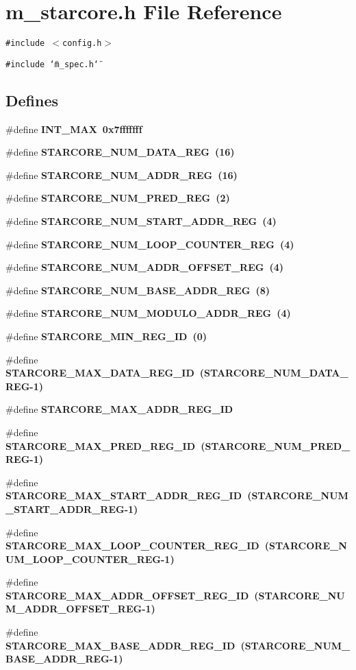 \section{m\_\-starcore.h File Reference}
\label{m__starcore_8h}
{\tt \#include $<$config.h$>$}\par
{\tt \#include \char`\"{}m\_\-spec.h\char`\"{}}\par
\subsection*{Defines}
\begin{CompactItemize}
\item 
\#define \bf{INT\_\-MAX}~0x7fffffff
\item 
\#define \bf{STARCORE\_\-NUM\_\-DATA\_\-REG}~(16)
\item 
\#define \bf{STARCORE\_\-NUM\_\-ADDR\_\-REG}~(16)
\item 
\#define \bf{STARCORE\_\-NUM\_\-PRED\_\-REG}~(2)
\item 
\#define \bf{STARCORE\_\-NUM\_\-START\_\-ADDR\_\-REG}~(4)
\item 
\#define \bf{STARCORE\_\-NUM\_\-LOOP\_\-COUNTER\_\-REG}~(4)
\item 
\#define \bf{STARCORE\_\-NUM\_\-ADDR\_\-OFFSET\_\-REG}~(4)
\item 
\#define \bf{STARCORE\_\-NUM\_\-BASE\_\-ADDR\_\-REG}~(8)
\item 
\#define \bf{STARCORE\_\-NUM\_\-MODULO\_\-ADDR\_\-REG}~(4)
\item 
\#define \bf{STARCORE\_\-MIN\_\-REG\_\-ID}~(0)
\item 
\#define \bf{STARCORE\_\-MAX\_\-DATA\_\-REG\_\-ID}~(STARCORE\_\-NUM\_\-DATA\_\-REG-1)
\item 
\#define \bf{STARCORE\_\-MAX\_\-ADDR\_\-REG\_\-ID}
\item 
\#define \bf{STARCORE\_\-MAX\_\-PRED\_\-REG\_\-ID}~(STARCORE\_\-NUM\_\-PRED\_\-REG-1)
\item 
\#define \bf{STARCORE\_\-MAX\_\-START\_\-ADDR\_\-REG\_\-ID}~(STARCORE\_\-NUM\_\-START\_\-ADDR\_\-REG-1)
\item 
\#define \bf{STARCORE\_\-MAX\_\-LOOP\_\-COUNTER\_\-REG\_\-ID}~(STARCORE\_\-NUM\_\-LOOP\_\-COUNTER\_\-REG-1)
\item 
\#define \bf{STARCORE\_\-MAX\_\-ADDR\_\-OFFSET\_\-REG\_\-ID}~(STARCORE\_\-NUM\_\-ADDR\_\-OFFSET\_\-REG-1)
\item 
\#define \bf{STARCORE\_\-MAX\_\-BASE\_\-ADDR\_\-REG\_\-ID}~(STARCORE\_\-NUM\_\-BASE\_\-ADDR\_\-REG-1)

\end{CompactItemize}
